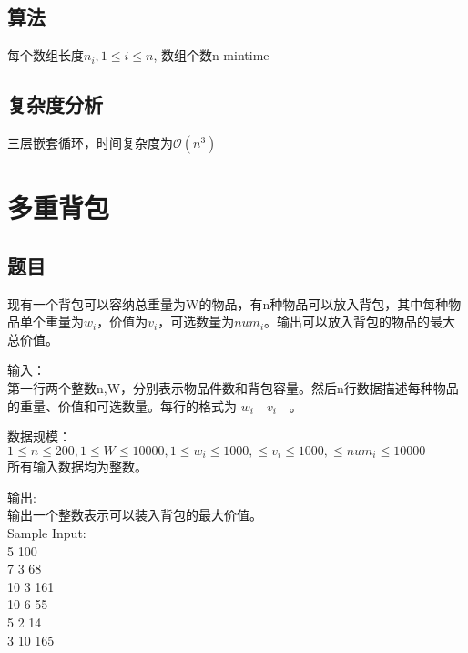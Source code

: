 \documentclass[UTF8]{ctexart}
\begin{document}
\subsection{算法}

\renewcommand{\algorithmicrequire}{\textbf{输入:}}
\renewcommand{\algorithmicensure}{\textbf{输出:}}
\begin{algorithm}
	\caption{}
	\begin{algorithmic}[1]
	\Require 每个数组长度$n_i,1\leq i\leq n$, 数组个数n
	\Ensure mintime
	\EndFor
				\EndIf
			\EndFor
		\EndFor
	\EndFor\\
	\end{algorithmic}
\end{algorithm}
\subsection{复杂度分析}
三层嵌套循环，时间复杂度为$\mathcal{O}(n^3)$

\section{多重背包}
\subsection{题目}
现有一个背包可以容纳总重量为W的物品，有n种物品可以放入背包，其中每种物品单个重量为$w_i$，价值为$v_i$，可选数量为$num_i$。输出可以放入背包的物品的最大总价值。

输入：\\
第一行两个整数n,W，分别表示物品件数和背包容量。然后n行数据描述每种物品的重量、价值和可选数量。每行的格式为 $w_i\quad  v_i\quad$。

数据规模：\\
$1\leq n\leq 200,1\leq W\leq 10000,1\leq w_i\leq 1000,\leq v_i\leq 1000,\leq num_i\leq 10000$\\
所有输入数据均为整数。

输出:\\
输出一个整数表示可以装入背包的最大价值。\\

Sample Input:\\
5 100\\
7 3 68\\
10 3 161\\
10 6 55\\
5 2 14\\
3 10 165\\
\end{document}
